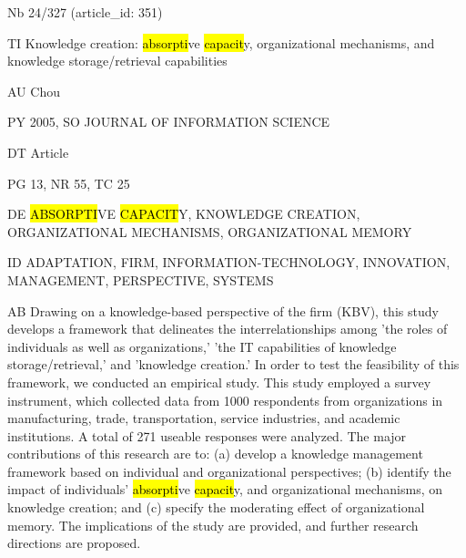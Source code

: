 \documentclass[a4paper]{article}
\begin{document}
\vspace*{-2cm}
Nb \tabto{0cm}24/327 (article\_id: 351)\par
TI \tabto{0cm}Knowledge creation: \hl{absorpti}ve \hl{capacit}y, organizational mechanisms, and knowledge storage/retrieval capabilities\par
AU \tabto{0cm}Chou\par
PY \tabto{0cm}2005, SO JOURNAL OF INFORMATION SCIENCE\par
DT \tabto{0cm}Article\par
PG \tabto{0cm}13, NR 55, TC 25\par
DE \tabto{0cm}\hl{ABSORPTI}VE \hl{CAPACIT}Y, KNOWLEDGE CREATION, ORGANIZATIONAL MECHANISMS, ORGANIZATIONAL MEMORY\par
ID \tabto{0cm}ADAPTATION, FIRM, INFORMATION-TECHNOLOGY, INNOVATION, MANAGEMENT, PERSPECTIVE, SYSTEMS\par
AB \tabto{0cm}Drawing on a knowledge-based perspective of the firm (KBV), this study develops a framework that delineates the interrelationships among 'the roles of individuals as well as organizations,' 'the IT capabilities of knowledge storage/retrieval,' and 'knowledge creation.' In order to test the feasibility of this framework, we conducted an empirical study. This study employed a survey instrument, which collected data from 1000 respondents from organizations in manufacturing, trade, transportation, service industries, and academic institutions. A total of 271 useable responses were analyzed. The major contributions of this research are to: (a) develop a knowledge management framework based on individual and organizational perspectives; (b) identify the impact of individuals' \hl{absorpti}ve \hl{capacit}y, and organizational mechanisms, on knowledge creation; and (c) specify the moderating effect of organizational memory. The implications of the study are provided, and further research directions are proposed.\par
\clearpage
\end{document}
